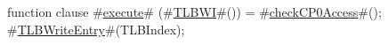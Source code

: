 function clause #\hyperref[zexecute]{execute}# (#\hyperref[zTLBWI]{TLBWI}#()) = {
  #\hyperref[zcheckCPzeroAccess]{checkCP0Access}#();
  #\hyperref[zTLBWriteEntry]{TLBWriteEntry}#(TLBIndex);
}
